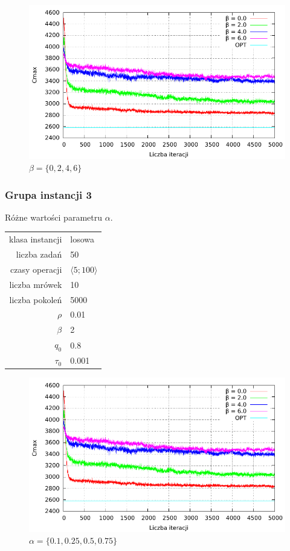 \documentclass[10pt,a4paper]{article}
\begin{document}
\begin{figure}[h]
    \centering
    \includegraphics{./figures/inst01_rnd_beta.pdf}
    \caption{$ \beta = \{ 0, 2, 4, 6 \} $}
\end{figure}


\newpage
\subsubsection{Grupa instancji 3}
Różne wartości parametru $\alpha$.

\begin{center}
\begin{tabular}{|r|l|}
  \hline
  klasa instancji & losowa \\
  liczba zadań & 50 \\
  czasy operacji & $ \langle 5;100 \rangle $  \\
  liczba mrówek & 10 \\
  liczba pokoleń & 5000 \\
  $ \rho $ & 0.01 \\
  $ \beta $ & 2 \\
  $ q_0 $ & 0.8 \\
  $ \tau_0 $ & 0.001 \\
  \hline
\end{tabular}
\end{center}

\begin{figure}[h]
    \centering
    \includegraphics{./figures/inst01_rnd_beta.pdf}
    \caption{$ \alpha = \{ 0.1, 0.25, 0.5, 0.75 \} $}
\end{figure}
\end{document}
